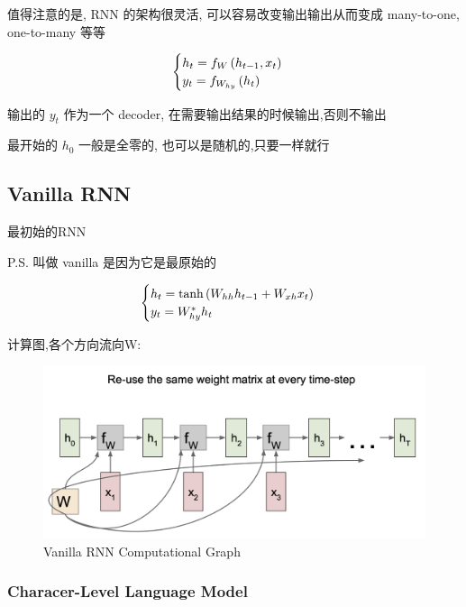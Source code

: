 	值得注意的是, RNN 的架构很灵活, 可以容易改变输出输出从而变成 many-to-one, one-to-many 等等

	\begin{equation}
		\begin{cases}
			h_t = f_W\left( h_{t-1}, x_t\right)
			\\
			y_t = f_{W_{hy}}\left( h_t\right)
		\end{cases}
	\end{equation}

	输出的 $y_t$ 作为一个 decoder, 在需要输出结果的时候输出,否则不输出

	最开始的 $h_0$ 一般是全零的, 也可以是随机的,只要一样就行

	\subsection{Vanilla RNN}

	最初始的RNN

	P.S. 叫做 vanilla 是因为它是最原始的

	\begin{equation}
		\begin{cases}
			h_t = \tanh\left( W_{hh}h_{t-1} + W_{xh}x_t\right)
			\\
			y_t = W_{hy}^*h_t
		\end{cases}
	\end{equation}
	
	计算图,各个方向流向W:
	
	\begin{figure}[htbp]
		\centering
		\includegraphics[scale=0.35]{figures/vanilla_rnn.png}
		\caption{Vanilla RNN Computational Graph}
	\end{figure}
	
	\subsubsection{Characer-Level Language Model}

